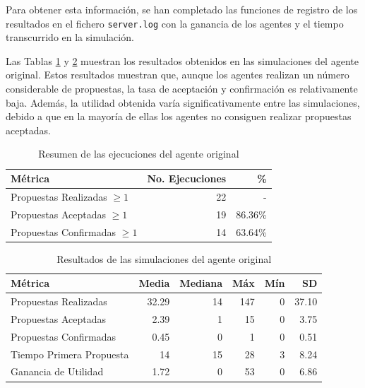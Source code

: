 \documentclass[12pt]{article}
\begin{document}
Para obtener esta información, se han completado las funciones de registro de los resultados en el fichero \texttt{server.log} con la ganancia de los agentes y el tiempo transcurrido en la simulación.

Las Tablas \ref{tab:summary1} y \ref{tab:results1} muestran los resultados obtenidos en las simulaciones del agente original. Estos resultados muestran que, aunque los agentes realizan un número considerable de propuestas, la tasa de aceptación y confirmación es relativamente baja. Además, la utilidad obtenida varía significativamente entre las simulaciones, debido a que en la mayoría de ellas los agentes no consiguen realizar propuestas aceptadas.

\begin{table}[h]
    \centering
    \begin{tabular}{|l|r|r|}
        \hline
        \textbf{Métrica}                & \textbf{No. Ejecuciones} & \textbf{\%} \\
        \hline
        Propuestas Realizadas $\geq 1$  & 22                       & -           \\
        \hline
        Propuestas Aceptadas $\geq 1$   & 19                       & 86.36\%     \\
        \hline
        Propuestas Confirmadas $\geq 1$ & 14                       & 63.64\%     \\
        \hline
    \end{tabular}
    \caption{Resumen de las ejecuciones del agente original}
    \label{tab:summary1}
\end{table}

\begin{table}[h]
    \centering
    \begin{tabular}{|l|r|r|r|r|r|}
        \hline
        \textbf{Métrica}         & \textbf{Media} & \textbf{Mediana} & \textbf{Máx} & \textbf{Mín} & \textbf{SD} \\
        \hline
        Propuestas Realizadas    & 32.29          & 14               & 147          & 0            & 37.10       \\
        \hline
        Propuestas Aceptadas     & 2.39           & 1                & 15           & 0            & 3.75        \\
        \hline
        Propuestas Confirmadas   & 0.45           & 0                & 1            & 0            & 0.51        \\
        \hline
        Tiempo Primera Propuesta & 14             & 15               & 28           & 3            & 8.24        \\
        \hline
        Ganancia de Utilidad     & 1.72           & 0                & 53           & 0            & 6.86        \\
        \hline
    \end{tabular}
    \caption{Resultados de las simulaciones del agente original}
    \label{tab:results1}
\end{table}
\end{document}
